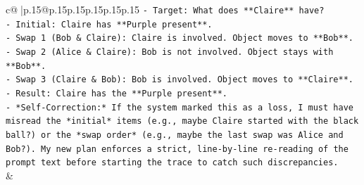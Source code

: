 \documentclass{article}
\begin{document}
{\begin{supertabular}{c@{$\;$}|p{.15\linewidth}@{}p{.15\linewidth}p{.15\linewidth}p{.15\linewidth}p{.15\linewidth}p{.15\linewidth}}
{{{\texttt{{-} Target: What does **Claire** have?} \\
\texttt{{-} Initial: Claire has **Purple present**.} \\
\texttt{{-} Swap 1 (Bob \& Claire): Claire is involved. Object moves to **Bob**.} \\
\texttt{{-} Swap 2 (Alice \& Claire): Bob is not involved. Object stays with **Bob**.} \\
\texttt{{-} Swap 3 (Claire \& Bob): Bob is involved. Object moves to **Claire**.} \\
\texttt{{-} Result: Claire has the **Purple present**.} \\
\texttt{{-} *Self{-}Correction:* If the system marked this as a loss, I must have misread the *initial* items (e.g., maybe Claire started with the black ball?) or the *swap order* (e.g., maybe the last swap was Alice and Bob?). My new plan enforces a strict, line{-}by{-}line re{-}reading of the prompt text before starting the trace to catch such discrepancies.} \\
            }
        }
    }
    & \\ \\

\end{supertabular}
}
\end{document}
